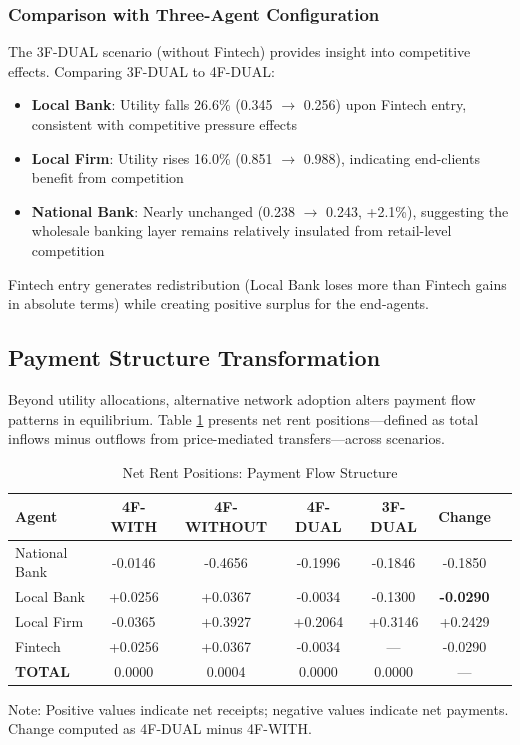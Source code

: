 \subsubsection{Comparison with Three-Agent Configuration}

The 3F-DUAL scenario (without Fintech) provides insight into competitive effects. Comparing 3F-DUAL to 4F-DUAL:

\begin{itemize}
    \item \textbf{Local Bank}: Utility falls 26.6\% (0.345 $\rightarrow$ 0.256) upon Fintech entry, consistent with competitive pressure effects
    
    \item \textbf{Local Firm}: Utility rises 16.0\% (0.851 $\rightarrow$ 0.988), indicating end-clients benefit from competition
    
    \item \textbf{National Bank}: Nearly unchanged (0.238 $\rightarrow$ 0.243, +2.1\%), suggesting the wholesale banking layer remains relatively insulated from retail-level competition
\end{itemize}

Fintech entry generates redistribution (Local Bank loses more than Fintech gains in absolute terms) while creating positive surplus for the end-agents.  

\subsection{Payment Structure Transformation}

Beyond utility allocations, alternative network adoption alters payment flow patterns in equilibrium. Table \ref{tab:net_rents_comparison} presents net rent positions—defined as total inflows minus outflows from price-mediated transfers—across scenarios.

\begin{table}[ht]
\centering
\caption{Net Rent Positions: Payment Flow Structure}
\label{tab:net_rents_comparison}
\begin{tabular}{lcccccc}
\toprule
\textbf{Agent} & \textbf{4F-WITH} & \textbf{4F-WITHOUT} & \textbf{4F-DUAL} & \textbf{3F-DUAL} & \textbf{Change}  \\
\midrule
National Bank  & -0.0146 & -0.4656 & -0.1996 & -0.1846 & -0.1850 \\
Local Bank     & +0.0256 & +0.0367 & -0.0034 & -0.1300 & \textbf{-0.0290}  \\
Local Firm     & -0.0365 & +0.3927 & +0.2064 & +0.3146 & +0.2429  \\
Fintech        & +0.0256 & +0.0367 & -0.0034 & — & -0.0290  \\
\midrule
\textbf{TOTAL} & 0.0000 & 0.0004 & 0.0000 & 0.0000 & —  \\
\bottomrule
\end{tabular}
\begin{tablenotes}
\small
\item Note: Positive values indicate net receipts; negative values indicate net payments. Change computed as 4F-DUAL minus 4F-WITH.
\end{tablenotes}
\end{table}

